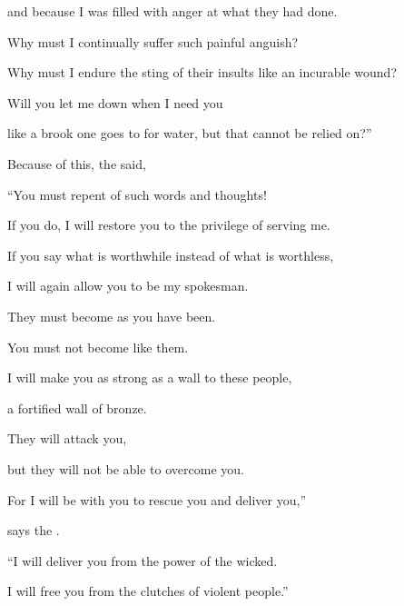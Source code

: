 {\par }{\Q and because I was filled
with anger at what they had done.
\par }{\Q {}Why
must I continually
suffer such painful
anguish?
\par }{\Q Why must I endure the sting of their insults like an incurable
wound?
\par }{\Q Will you let me down
when I need you
\par }{\Q like
a brook
one goes to for water,
but that cannot
be relied on?”
\par }{\PP {}Because
of this, the
{}
said,
\par }{\Q “You must repent
of such words and thoughts!
\par }{\Q If
you do, I will restore
you to the privilege of serving
me.

\par }{\Q If
you say
what is worthwhile
instead of what is worthless,
\par }{\Q I will again allow you to be
my spokesman.
\par }{\Q They
must become
as
you have been.
\par }{\Q You
must not
become
like them.
\par }{\Q {}I will make
you as strong as a wall to these
people,
\par }{\Q a fortified
wall
of bronze.
\par }{\Q They will attack
you,
\par }{\Q but they will not
be able
to overcome you.
\par }{\Q For
I
will be with
you to rescue
you and deliver
you,”

\par }{\Q says
the {}.
\par }{\Q {}“I will deliver
you from the power
of the wicked.
\par }{\Q I will free you
from the clutches of violent people.”

}
